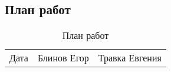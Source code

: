 \documentclass[./intro.tex]{subfiles}
\begin{document}
\subsection{План работ}
\begin{table}
    \caption{План работ}
    \label{table:2}
    \begin{tabular}{|c|c|c|}
        Дата & Блинов Егор & Травка Евгения
    \end{tabular}
\end{table}
\end{document}
